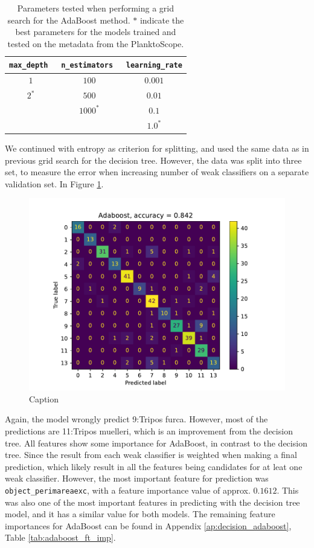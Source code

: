 \begin{table}[h]
    \centering
    \begin{tabular}{ccc}
        \hline
        \verb|max_depth| \, & \verb|n_estimators| \, & \verb|learning_rate| \\
        \hline 
        $1$ & $100$ & $0.001$ \\
        $2^*$ & $500$ & $0.01$ \\
         & $1000^*$ & $0.1$ \\
         & & $1.0^*$ \\
        \hline
    \end{tabular}
    \caption{Parameters tested when performing a grid search for the AdaBoost method. $*$ indicate the best parameters for the models trained and tested on the metadata from the PlanktoScope.}
    \label{tab:params_adaboost}
\end{table}
We continued with entropy as criterion for splitting, and used the same data as in previous grid search for the decision tree. However, the data was split into three set, to measure the error when increasing number of weak classifiers on a separate validation set. In Figure \ref{fig:cm_adaboost_metadata}.
\begin{figure}
    \centering
    \includegraphics[width=\linewidth]{latex/figures/cm_adaboost_planktoscope_metadata.pdf}
    \caption{Caption}
    \label{fig:cm_adaboost_metadata}
\end{figure}
Again, the model wrongly predict 9:Tripos furca. However, most of the predictions are 11:Tripos muelleri, which is an improvement from the decision tree. All features show some importance for AdaBoost, in contrast to the decision tree. Since the result from each weak classifier is weighted when making a final prediction, which likely result in all the features being candidates for at leat one weak classifier. However, the most important feature for prediction was \verb|object_perimareaexc|, with a feature importance value of approx. $0.1612$. This was also one of the most important features in predicting with the decision tree model, and it has a similar value for both models. The remaining feature importances for AdaBoost can be found in Appendix \ref{ap:decision_adaboost}, Table \ref{tab:adaboost_ft_imp}. 

